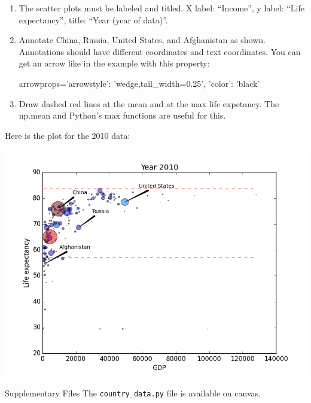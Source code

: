 \documentclass[11pt]{cselabheader}
\begin{document}
\begin{ex}[plotcountries.py]
\begin{enumerate}
\item The scatter plots must be labeled and titled. X label: ``Income'', y
label: ``Life expectancy'', title: ``Year (year of data)''.

\item Annotate China, Russia, United States, and Afghanistan as shown.
Annotations should have different coordinates and text coordinates.
You can get an arrow like in the example with this property:
\begin{python3code}
arrowprops={'arrowstyle': 'wedge,tail_width=0.25', 'color': 'black'}
\end{python3code}

\item Draw dashed red lines at the mean and at the max life expetancy.
The np.mean and Python's max functions are useful for this.
\end{enumerate}

Here is the plot for the 2010 data:
\begin{center}
\includegraphics[width=\textwidth]{img/scatter_2010.png}
\end{center}
\end{ex}

\begin{infobox}{Supplementary Files}
The \texttt{country\_data.py} file is available on canvas.
\end{infobox}

\newpage
\end{document}
